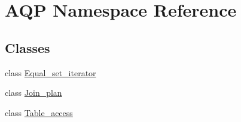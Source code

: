 \hypertarget{namespaceAQP}{}\section{A\+QP Namespace Reference}
\label{namespaceAQP}
\subsection*{Classes}
\begin{DoxyCompactItemize}
\item 
class \mbox{\hyperlink{classAQP_1_1Equal__set__iterator}{Equal\+\_\+set\+\_\+iterator}}
\item 
class \mbox{\hyperlink{classAQP_1_1Join__plan}{Join\+\_\+plan}}
\item 
class \mbox{\hyperlink{classAQP_1_1Table__access}{Table\+\_\+access}}
\end{DoxyCompactItemize}
